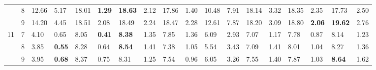 \documentclass[conference]{IEEEtran}
\begin{document}
\begin{table}[]
\begin{tabular}{|cl|ll|ll|ll|ll|ll|ll|ll|ll|}
		\multicolumn{1}{|c|}{}                    & 8          & \multicolumn{1}{l|}{12.66}         & 5.17          & \multicolumn{1}{l|}{18.01}          & \textbf{1.29} & \multicolumn{1}{l|}{\textbf{18.63}} & 2.12          & \multicolumn{1}{l|}{17.86}          & 1.40          & \multicolumn{1}{l|}{10.48}                & 7.91  & \multicolumn{1}{l|}{18.14} & 3.32 & \multicolumn{1}{l|}{18.35}          & 2.35          & \multicolumn{1}{l|}{17.73}          & 2.50          \\ \cline{2-18} 
		\multicolumn{1}{|c|}{}                    & 9          & \multicolumn{1}{l|}{14.20}         & 4.45          & \multicolumn{1}{l|}{18.51}          & 2.08          & \multicolumn{1}{l|}{18.49}          & 2.24          & \multicolumn{1}{l|}{18.47}          & 2.28          & \multicolumn{1}{l|}{12.61}                & 7.87  & \multicolumn{1}{l|}{18.20} & 3.09 & \multicolumn{1}{l|}{18.80}          & \textbf{2.06} & \multicolumn{1}{l|}{\textbf{19.62}} & 2.76          \\ \hline
		\multicolumn{1}{|c|}{\multirow{3}{*}{11}} & 7          & \multicolumn{1}{l|}{4.10}          & 0.65          & \multicolumn{1}{l|}{8.05}           & \textbf{0.41} & \multicolumn{1}{l|}{\textbf{8.38}}  & 1.35          & \multicolumn{1}{l|}{7.85}           & 1.36          & \multicolumn{1}{l|}{6.09}                 & 2.93  & \multicolumn{1}{l|}{7.07}  & 1.17 & \multicolumn{1}{l|}{7.78}           & 0.87          & \multicolumn{1}{l|}{8.14}           & 1.23          \\ \cline{2-18} 
		\multicolumn{1}{|c|}{}                    & 8          & \multicolumn{1}{l|}{3.85}          & \textbf{0.55} & \multicolumn{1}{l|}{8.28}           & 0.64          & \multicolumn{1}{l|}{\textbf{8.54}}  & 1.41          & \multicolumn{1}{l|}{7.38}           & 1.05          & \multicolumn{1}{l|}{5.54}                 & 3.43  & \multicolumn{1}{l|}{7.09}  & 1.41 & \multicolumn{1}{l|}{8.01}           & 1.04          & \multicolumn{1}{l|}{8.27}           & 1.36          \\ \cline{2-18} 
		\multicolumn{1}{|c|}{}                    & 9          & \multicolumn{1}{l|}{3.95}          & \textbf{0.68} & \multicolumn{1}{l|}{8.37}           & 0.75          & \multicolumn{1}{l|}{8.31}           & 1.25          & \multicolumn{1}{l|}{7.54}           & 0.96          & \multicolumn{1}{l|}{6.05}                 & 3.26  & \multicolumn{1}{l|}{7.55}  & 1.40 & \multicolumn{1}{l|}{7.87}           & 1.03          & \multicolumn{1}{l|}{\textbf{8.64}}  & 1.62          \\ \hline

\end{tabular}
\end{table}
\end{document}
